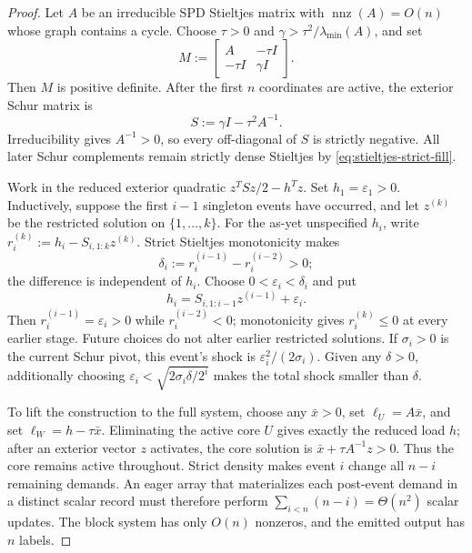 \begin{proof}
Let $A$ be an irreducible SPD Stieltjes matrix with
$\operatorname{nnz}(A)=O(n)$ whose graph contains a cycle.  Choose $\tau>0$
and $\gamma>\tau^2/\lambda_{\min}(A)$, and set
\begin{equation}
 M:=\begin{bmatrix}A&-\tau I\\-\tau I&\gamma I\end{bmatrix}.
 \label{eq:cyclic-core-leaf-matrix}
\end{equation}
Then $M$ is positive definite.  After the first $n$ coordinates are active,
the
exterior Schur matrix is
\begin{equation}
 S:=\gamma I-\tau^2A^{-1}.
 \label{eq:dense-leaf-schur}
\end{equation}
Irreducibility gives $A^{-1}>0$, so every off-diagonal of $S$ is strictly
negative.  All later Schur complements remain strictly dense Stieltjes by
\cref{eq:stieltjes-strict-fill}.

Work in the reduced exterior quadratic $z^TSz/2-h^Tz$.  Set
$h_1=\varepsilon_1>0$.  Inductively, suppose the first $i-1$ singleton events
have occurred, and let $z^{(k)}$ be the restricted solution on
$\{1,\ldots,k\}$.  For the as-yet unspecified $h_i$, write
$r_i^{(k)}:=h_i-S_{i,1:k}z^{(k)}$.  Strict Stieltjes monotonicity makes
\begin{equation*}
 \delta_i:=r_i^{(i-1)}-r_i^{(i-2)}>0;
\end{equation*}
the difference is independent of $h_i$.  Choose
$0<\varepsilon_i<\delta_i$ and put
\begin{equation}
 h_i=S_{i,1:i-1}z^{(i-1)}+\varepsilon_i.
 \label{eq:light-cascade-load}
\end{equation}
Then $r_i^{(i-1)}=\varepsilon_i>0$ while
$r_i^{(i-2)}<0$; monotonicity gives $r_i^{(k)}\leq0$ at every earlier stage.
Future choices do not alter earlier restricted solutions.  If $\sigma_i>0$
is the current Schur pivot, this event's shock is
$\varepsilon_i^2/(2\sigma_i)$.  Given any $\delta>0$, additionally choosing
$\varepsilon_i<\sqrt{2\sigma_i\delta/2^i}$ makes the total shock smaller
than $\delta$.

To lift the construction to the full system, choose any $\bar x>0$, set
$\ell_U=A\bar x$, and set $\ell_W=h-\tau\bar x$.  Eliminating the active
core $U$ gives exactly the reduced load $h$; after an exterior vector $z$
activates, the core solution is $\bar x+\tau A^{-1}z>0$.  Thus the core
remains active throughout.  Strict density makes event $i$ change all $n-i$
remaining demands.  An eager array that materializes each post-event demand
in a distinct scalar record must therefore perform
$\sum_{i<n}(n-i)=\Theta(n^2)$ scalar updates.  The block system has only
$O(n)$ nonzeros, and the emitted output has $n$ labels.
\end{proof}

